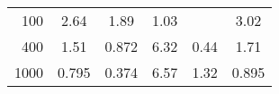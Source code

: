 \begin{table}
\begin{tabular}{r c c c c c}
        100 & 2.64   & 1.89   & 1.03   &        & 3.02   \\
        400 & 1.51   & 0.872  & 6.32   & 0.44   & 1.71   \\
        1000 & 0.795 & 0.374  & 6.57   & 1.32   & 0.895  \\
        \bottomrule
    \end{tabular}
\end{table}

